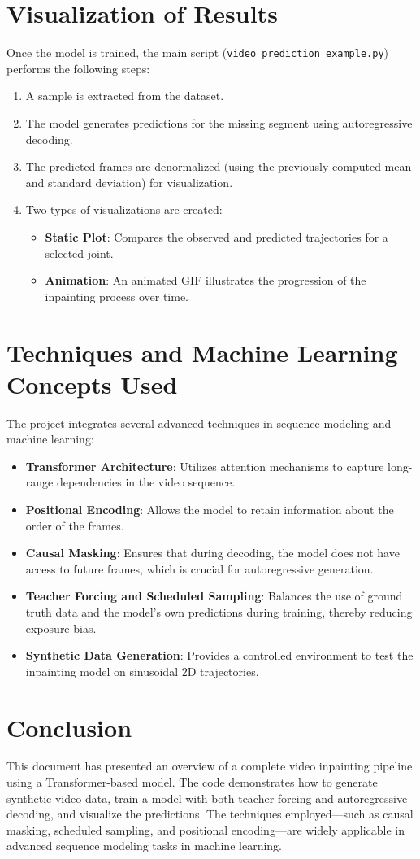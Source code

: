 \documentclass{article}
\begin{document}
\section{Visualization of Results}
Once the model is trained, the main script (\texttt{video\_prediction\_example.py}) performs the following steps:
\begin{enumerate}
    \item A sample is extracted from the dataset.
    \item The model generates predictions for the missing segment using autoregressive decoding.
    \item The predicted frames are denormalized (using the previously computed mean and standard deviation) for visualization.
    \item Two types of visualizations are created:
    \begin{itemize}
        \item \textbf{Static Plot}: Compares the observed and predicted trajectories for a selected joint.
        \item \textbf{Animation}: An animated GIF illustrates the progression of the inpainting process over time.
    \end{itemize}
\end{enumerate}

\section{Techniques and Machine Learning Concepts Used}
The project integrates several advanced techniques in sequence modeling and machine learning:
\begin{itemize}
    \item \textbf{Transformer Architecture}: Utilizes attention mechanisms to capture long-range dependencies in the video sequence.
    \item \textbf{Positional Encoding}: Allows the model to retain information about the order of the frames.
    \item \textbf{Causal Masking}: Ensures that during decoding, the model does not have access to future frames, which is crucial for autoregressive generation.
    \item \textbf{Teacher Forcing and Scheduled Sampling}: Balances the use of ground truth data and the model's own predictions during training, thereby reducing exposure bias.
    \item \textbf{Synthetic Data Generation}: Provides a controlled environment to test the inpainting model on sinusoidal 2D trajectories.
\end{itemize}

\section{Conclusion}
This document has presented an overview of a complete video inpainting pipeline using a Transformer-based model. The code demonstrates how to generate synthetic video data, train a model with both teacher forcing and autoregressive decoding, and visualize the predictions. The techniques employed—such as causal masking, scheduled sampling, and positional encoding—are widely applicable in advanced sequence modeling tasks in machine learning.
\end{document}

